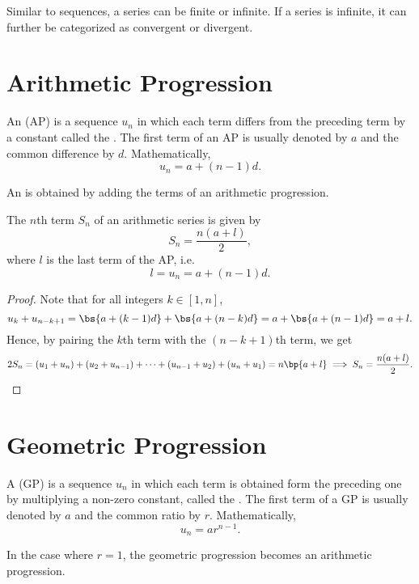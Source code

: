 Similar to sequences, a series can be finite or infinite. If a series is infinite, it can further be categorized as convergent or divergent.

\section{Arithmetic Progression}

\begin{definition}
    An  (AP) is a sequence $u_n$ in which each term differs from the preceding term by a constant called the . The first term of an AP is usually denoted by $a$ and the common difference by $d$. Mathematically, \[u_n = a + (n-1)d.\]
\end{definition}

\begin{definition}
    An  is obtained by adding the terms of an arithmetic progression.
\end{definition}

\begin{proposition}
    The $n$th term $S_n$ of an arithmetic series is given by \[S_n = \frac{n(a + l)}{2},\] where $l$ is the last term of the AP, i.e. \[l = u_n = a + (n-1) d.\]
\end{proposition}
\begin{proof}
    Note that for all integers $k \in [1, n]$, \[u_k + u_{n - k + 1} = \bs{a + (k-1)d} + \bs{a + (n-k)d} = a + \bs{a + (n-1)d} = a + l.\] Hence, by pairing the $k$th term with the $(n-k+1)$th term, we get \[2S_n = (u_1 + u_n) + (u_2 + u_{n-1}) + \dots + (u_{n-1} + u_2) + (u_n + u_1) = n\bp{a + l} \implies S_n = \frac{n(a + l)}{2}.\]
\end{proof}

\section{Geometric Progression}

\begin{definition}
    A  (GP) is a sequence $u_n$ in which each term is obtained form the preceding one by multiplying a non-zero constant, called the . The first term of a GP is usually denoted by $a$ and the common ratio by $r$. Mathematically, \[u_n = ar^{n-1}.\]
\end{definition}

\begin{remark}
    In the case where $r = 1$, the geometric progression becomes an arithmetic progression.
\end{remark}

